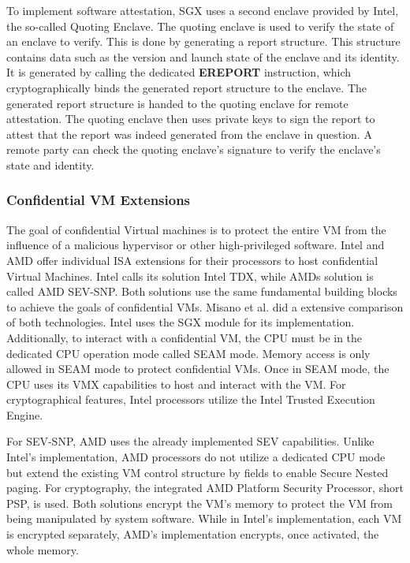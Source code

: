 To implement software attestation, SGX uses a second enclave provided by Intel, the so-called Quoting Enclave. The
quoting enclave is used to verify the state of an enclave to verify. This is done by generating a report structure. This
structure contains data such as the version and launch state of the enclave and its identity. It is generated by calling
the dedicated \textbf{EREPORT} instruction, which cryptographically binds the generated report structure to the enclave.
The generated report structure is handed to the quoting enclave for remote attestation. The quoting enclave then uses
private keys to sign the report to attest that the report was indeed generated from the enclave in question. A remote
party can check the quoting enclave's signature to verify the enclave's state and identity.

\subsubsection{Confidential VM Extensions}
\label{section:20:confidential_vms}
The goal of confidential Virtual machines is to protect the entire VM from the influence of a malicious hypervisor or
other high-privileged software. Intel and AMD offer individual ISA extensions for their processors to host confidential
Virtual Machines. Intel calls its solution Intel TDX, while AMDs solution is called AMD
SEV-SNP.\cite{tdx_whitepaper,kaplan_amd_2020} Both solutions use the
same fundamental building blocks to achieve the goals of confidential VMs. Misano et al. did a extensive comparison of
both technologies.\cite{misono_confidential_2024}
Intel uses the SGX module for its implementation. Additionally, to interact with a confidential VM, the CPU must be in
the dedicated CPU operation mode
called SEAM mode. Memory access is only allowed in SEAM mode to protect confidential VMs. Once in SEAM mode, the CPU
uses its VMX capabilities to host and interact with the VM. For cryptographical features, Intel processors utilize the
Intel Trusted Execution Engine.

For SEV-SNP, AMD uses the already implemented SEV capabilities. Unlike Intel's implementation, AMD processors do not
utilize a dedicated CPU mode but extend the existing VM control structure by fields to enable Secure Nested paging. For
cryptography, the integrated AMD Platform Security Processor, short PSP, is used. Both solutions encrypt the VM's
memory to protect the VM from being manipulated by system software. While in Intel's implementation, each VM is
encrypted separately, AMD's implementation encrypts, once activated, the whole memory.

